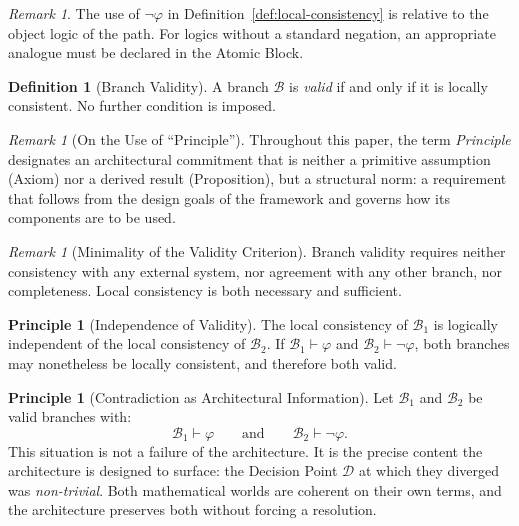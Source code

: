 \documentclass[12pt, a4paper]{article}
\theoremstyle{plain}
\theoremstyle{definition}
\newtheorem{definition}[theorem]{Definition}
\newtheorem{principle}[theorem]{Principle}
\theoremstyle{remark}
\newtheorem{remark}[theorem]{Remark}
\begin{document}
\begin{remark}
The use of $\neg\varphi$ in Definition~\ref{def:local-consistency}
is relative to the object logic of the path. For logics without a
standard negation, an appropriate analogue must be declared in
the Atomic Block.
\end{remark}

\begin{definition}[Branch Validity]
\label{def:validity}
A branch $\mathcal{B}$ is \emph{valid} if and only if it is
locally consistent. No further condition is imposed.
\end{definition}

\begin{remark}[On the Use of ``Principle'']
\label{rem:principle}
Throughout this paper, the term \emph{Principle} designates an
architectural commitment that is neither a primitive assumption
(Axiom) nor a derived result (Proposition), but a structural
norm: a requirement that follows from the design goals of the
framework and governs how its components are to be used.
\end{remark}

\begin{remark}[Minimality of the Validity Criterion]
Branch validity requires neither consistency with any external
system, nor agreement with any other branch, nor completeness.
Local consistency is both necessary and sufficient.
\end{remark}

\begin{principle}[Independence of Validity]
\label{prin:validity-independent}
The local consistency of $\mathcal{B}_1$ is logically independent
of the local consistency of $\mathcal{B}_2$. If
$\mathcal{B}_1 \vdash \varphi$ and
$\mathcal{B}_2 \vdash \neg\varphi$, both branches may nonetheless
be locally consistent, and therefore both valid.
\end{principle}

\begin{principle}[Contradiction as Architectural Information]
\label{prin:contradiction}
Let $\mathcal{B}_1$ and $\mathcal{B}_2$ be valid branches with:
\[
  \mathcal{B}_1 \vdash \varphi
  \qquad\text{and}\qquad
  \mathcal{B}_2 \vdash \neg\varphi.
\]
This situation is not a failure of the architecture. It is the
precise content the architecture is designed to surface: the
Decision Point $\mathcal{D}$ at which they diverged was
\emph{non-trivial}. Both mathematical worlds are coherent on
their own terms, and the architecture preserves both without
forcing a resolution.
\end{principle}
\end{document}
